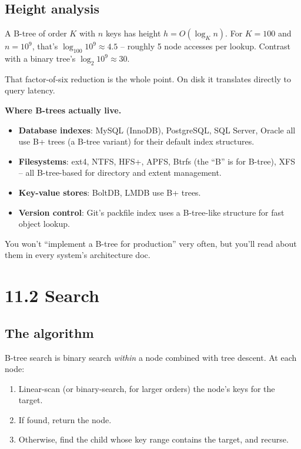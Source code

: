 \documentclass[11pt]{article}
\begin{document}
\subsection*{Height analysis}

A B-tree of order $K$ with $n$ keys has height $h = O(\log_K n)$. For $K = 100$ and $n = 10^9$, that's $\log_{100} 10^9 \approx 4.5$ -- roughly 5 node accesses per lookup. Contrast with a binary tree's $\log_2 10^9 \approx 30$.

That factor-of-six reduction is the whole point. On disk it translates directly to query latency.

\begin{examplebox}
\textbf{Where B-trees actually live.}
\begin{itemize}[leftmargin=*]
    \item \textbf{Database indexes}: MySQL (InnoDB), PostgreSQL, SQL Server, Oracle all use B+ trees (a B-tree variant) for their default index structures.
    \item \textbf{Filesystems}: ext4, NTFS, HFS+, APFS, Btrfs (the ``B'' is for B-tree), XFS -- all B-tree-based for directory and extent management.
    \item \textbf{Key-value stores}: BoltDB, LMDB use B+ trees.
    \item \textbf{Version control}: Git's packfile index uses a B-tree-like structure for fast object lookup.
\end{itemize}
You won't ``implement a B-tree for production'' very often, but you'll read about them in every system's architecture doc.
\end{examplebox}

\section{11.2 Search}

\subsection*{The algorithm}

B-tree search is binary search \emph{within} a node combined with tree descent. At each node:
\begin{enumerate}[leftmargin=*]
    \item Linear-scan (or binary-search, for larger orders) the node's keys for the target.
    \item If found, return the node.
    \item Otherwise, find the child whose key range contains the target, and recurse.
\end{enumerate}
\end{document}
